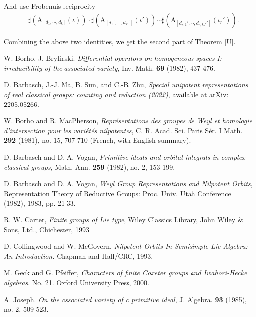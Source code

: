 \documentclass[12pt, a4paper]{amsart}
\numberwithin{equation}{section}
\begin{document}
And use Frobenuis reciprocity
\begin{align*}
    [1_{W_{\nu}}: \sigma] = \sharp(\mathrm{A}_{[d_1,\cdots,d_k]}(\iota))\cdot \sharp(\mathrm{A}_{[d_1',\cdots,d_{k'}']}(\iota'))\cdots \sharp(\mathrm{A}_{[d_{r,1}',\cdots,d_{r,k_r'}']}(\iota_r')).
\end{align*}

Combining the above two identities, we get the second part of Theorem \ref{U}.






\begin{thebibliography}{99}

    W. Borho, J. Brylinski. \textit{Differential operators on homogeneous spaces I: irreducibility of the associated variety}, Inv. Math. \textbf{69} (1982), 437-476. 


   D. Barbasch, J.-J. Ma, B. Sun, and C.-B. Zhu, \textit{Special unipotent representations of real classical groups: counting and reduction (2022)}, available at arXiv: 2205.05266.

    W. Borho and R. MacPherson, \textit{Repr\'esentations des groupes de Weyl et homologie d'intersection pour les vari\'et\'es nilpotentes}, C. R. Acad. Sci. Paris S\'er. I Math. \textbf{292} (1981), no. 15, 707-710 (French, with English summary).

   D. Barbasch and D. A. Vogan, \textit{Primitive ideals and orbital integrals in complex classical groups}, Math. Ann. \textbf{259} (1982), no. 2, 153-199.

    D. Barbasch and D. A. Vogan, \textit{Weyl Group Representations and Nilpotent Orbits}, Representation Theory of Reductive Groups: Proc. Univ. Utah Conference (1982), 1983, pp. 21-33.



    R. W. Carter, \textit{Finite groups of Lie type}, Wiley Classics Library, John Wiley $\&$ Sons, Ltd., Chichester, 1993

   D. Collingwood and W. McGovern, \textit{Nilpotent Orbits In Semisimple Lie Algebra: An Introduction.} Chapman and Hall/CRC, 1993.

    M. Geck and G. Pfeiffer, \textit{Characters of finite Coxeter groups and Iwahori-Hecke algebras}. No. 21. Oxford University Press, 2000.
    
    A. Joseph. \textit{On the associated variety of a primitive ideal}, J. Algebra. \textbf{93} (1985), no. 2, 509-523.


\end{thebibliography}
\end{document}
